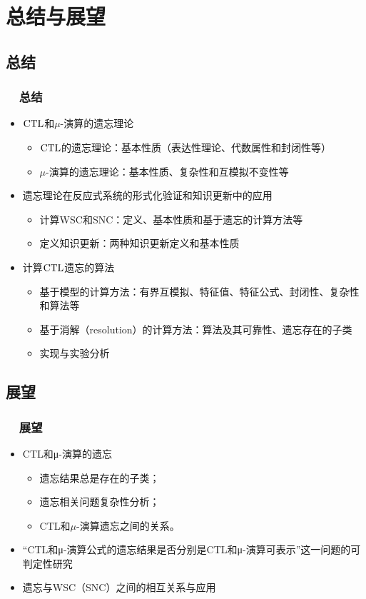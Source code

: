 \documentclass[9pt, CJK]{beamer}
\begin{document}
	
	\section{总结与展望}
	\subsection*{总结}
	\begin{frame}
		\frametitle{~~总结}
		\begin{itemize}[<+-| alert@+>]
			\vskip 8pt
			\item $\textrm{CTL}$和$\mu$-演算的遗忘理论
			\begin{itemize}
				\item $\textrm{CTL}$的遗忘理论：基本性质（表达性理论、代数属性和封闭性等）
				\item $\mu$-演算的遗忘理论：基本性质、复杂性和互模拟不变性等
			\end{itemize}
			\item 遗忘理论在反应式系统的形式化验证和知识更新中的应用
			\begin{itemize}
				\item 计算WSC和SNC：定义、基本性质和基于遗忘的计算方法等
				\item 定义知识更新：两种知识更新定义和基本性质
			\end{itemize}
			\item 计算$\textrm{CTL}$遗忘的算法
			\begin{itemize}
				\item 基于模型的计算方法：有界互模拟、特征值、特征公式、封闭性、复杂性和算法等
				\item 基于消解（resolution）的计算方法：算法及其可靠性、遗忘存在的子类
				\item 实现与实验分析
			\end{itemize}
		\end{itemize}
	\end{frame}
	
	\subsection*{展望}
	\begin{frame}
		\frametitle{~~展望}
		\begin{spacing}{1.5}
			\begin{itemize}
				\item CTL和μ-演算的遗忘
					\begin{itemize}
						\item 遗忘结果总是存在的子类；
						\item 遗忘相关问题复杂性分析；
						\item CTL和$\mu$-演算遗忘之间的关系。
					\end{itemize}
				\item “CTL和μ-演算公式的遗忘结果是否分别是CTL和μ-演算可表示”这一问题的可判定性研究
				\item 遗忘与WSC（SNC）之间的相互关系与应用
			\end{itemize}
		\end{spacing}
	\end{frame}
	
\end{document}
